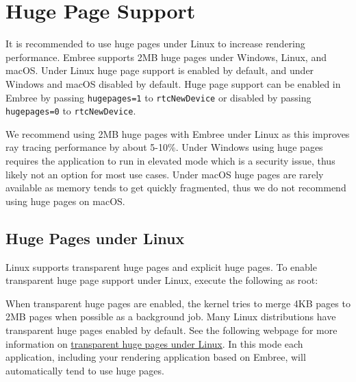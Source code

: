 \section{Huge Page Support}\label{huge-page-support}

It is recommended to use huge pages under Linux to increase rendering
performance. Embree supports 2MB huge pages under Windows, Linux, and
macOS. Under Linux huge page support is enabled by default, and under
Windows and macOS disabled by default. Huge page support can be enabled
in Embree by passing \texttt{hugepages=1} to \texttt{rtcNewDevice} or
disabled by passing \texttt{hugepages=0} to \texttt{rtcNewDevice}.

We recommend using 2MB huge pages with Embree under Linux as this
improves ray tracing performance by about 5-10\%. Under Windows using
huge pages requires the application to run in elevated mode which is a
security issue, thus likely not an option for most use cases. Under
macOS huge pages are rarely available as memory tends to get quickly
fragmented, thus we do not recommend using huge pages on macOS.

\subsection{Huge Pages under Linux}\label{huge-pages-under-linux}

Linux supports transparent huge pages and explicit huge pages. To enable
transparent huge page support under Linux, execute the following as
root:

\begin{Shaded}
\begin{Highlighting}[]
\OperatorTok{\textgreater{}} \OperatorTok{/}\OperatorTok{/}\OperatorTok{/}\OperatorTok{/}\OperatorTok{/}
\end{Highlighting}
\end{Shaded}

When transparent huge pages are enabled, the kernel tries to merge 4KB
pages to 2MB pages when possible as a background job. Many Linux
distributions have transparent huge pages enabled by default. See the
following webpage for more information on
\href{https://www.kernel.org/doc/Documentation/vm/transhuge.txt}{transparent
huge pages under Linux}. In this mode each application, including your
rendering application based on Embree, will automatically tend to use
huge pages.

